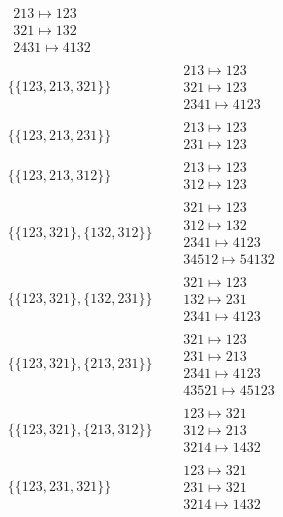 \begin{tiny}
\begin{align}
\begin{matrix}
213 \mapsto 123\\321 \mapsto 132\\2431 \mapsto 4132
\end{matrix}
\\
\{\{123, 213, 321\}\}
\quad
&
\begin{matrix}
213 \mapsto 123\\321 \mapsto 123\\2341 \mapsto 4123
\end{matrix}
\\
\{\{123, 213, 231\}\}
\quad
&
\begin{matrix}
213 \mapsto 123\\231 \mapsto 123
\end{matrix}
\\
\{\{123, 213, 312\}\}
\quad
&
\begin{matrix}
213 \mapsto 123\\312 \mapsto 123
\end{matrix}
\\
\{\{123, 321\}, \{132, 312\}\}
\quad
&
\begin{matrix}
321 \mapsto 123\\312 \mapsto 132\\2341 \mapsto 4123\\34512 \mapsto 54132
\end{matrix}
\\
\{\{123, 321\}, \{132, 231\}\}
\quad
&
\begin{matrix}
321 \mapsto 123\\132 \mapsto 231\\2341 \mapsto 4123
\end{matrix}
\\
\{\{123, 321\}, \{213, 231\}\}
\quad
&
\begin{matrix}
321 \mapsto 123\\231 \mapsto 213\\2341 \mapsto 4123\\43521 \mapsto 45123
\end{matrix}
\\
\{\{123, 321\}, \{213, 312\}\}
\quad
&
\begin{matrix}
123 \mapsto 321\\312 \mapsto 213\\3214 \mapsto 1432
\end{matrix}
\\
\{\{123, 231, 321\}\}
\quad
&
\begin{matrix}
123 \mapsto 321\\231 \mapsto 321\\3214 \mapsto 1432

\end{matrix}
\end{align}
\end{tiny}

